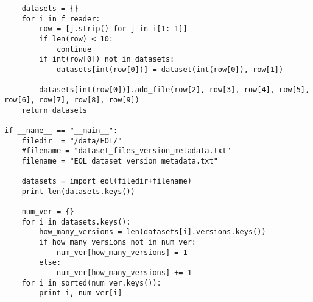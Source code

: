\begin{verbatim}
	datasets = {}
	for i in f_reader:
		row = [j.strip() for j in i[1:-1]]
		if len(row) < 10:
			continue
		if int(row[0]) not in datasets:
			datasets[int(row[0])] = dataset(int(row[0]), row[1])

		datasets[int(row[0])].add_file(row[2], row[3], row[4], row[5], row[6], row[7], row[8], row[9])
	return datasets

if __name__ == "__main__":
	filedir  = "/data/EOL/"
	#filename = "dataset_files_version_metadata.txt"
	filename = "EOL_dataset_version_metadata.txt"

	datasets = import_eol(filedir+filename)
	print len(datasets.keys())

	num_ver = {}
	for i in datasets.keys():
		how_many_versions = len(datasets[i].versions.keys())
		if how_many_versions not in num_ver:
			num_ver[how_many_versions] = 1
		else:
			num_ver[how_many_versions] += 1
	for i in sorted(num_ver.keys()):
		print i, num_ver[i]
\end{verbatim}